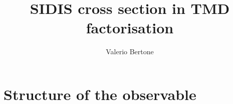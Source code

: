 \documentclass[10pt,a4paper]{article}
\begin{document}
\title{SIDIS cross section in TMD factorisation}

\author{Valerio Bertone}

\maketitle

\tableofcontents{}

\section{Structure of the observable}
\end{document}
